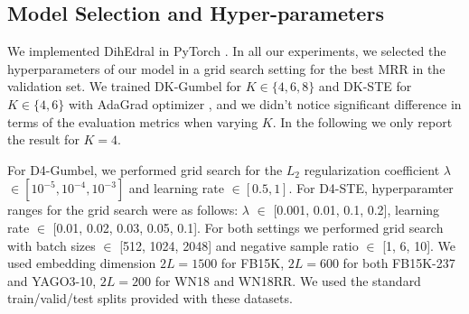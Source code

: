 \documentclass[11pt,a4paper]{article}
\begin{document}
\subsection{Model Selection and Hyper-parameters} 
We implemented DihEdral in PyTorch \cite{pytorch}. In all our experiments, we selected the hyperparameters of our model in a grid search setting for the best MRR in the validation set. We trained DK-Gumbel for $K\in\{4, 6, 8\}$ and DK-STE for $K \in \{4, 6\}$ with AdaGrad optimizer \cite{adagrad}, and we didn't notice significant difference in terms of the evaluation metrics when varying $K$. In the following we only report the result for $K=4$.

For D4-Gumbel, we performed grid search for the $L_2$ regularization coefficient $\lambda$ $\in [10^{-5},10^{-4},10^{-3}]$ and learning rate $\in [0.5, 1]$. For D4-STE, hyperparamter ranges for the grid search were as follows: $\lambda$ $\in$ [0.001, 0.01, 0.1, 0.2], learning rate $\in$ [0.01, 0.02, 0.03, 0.05, 0.1]. For both settings we performed grid search with batch sizes $\in$ [512, 1024, 2048] and negative sample ratio $\in$ [1, 6, 10]. We used embedding dimension $2L=1500$ for FB15K, $2L=600$ for both FB15K-237 and YAGO3-10, $2L=200$ for WN18 and WN18RR. We used the standard train/valid/test splits provided with these datasets.



 
\end{document}
